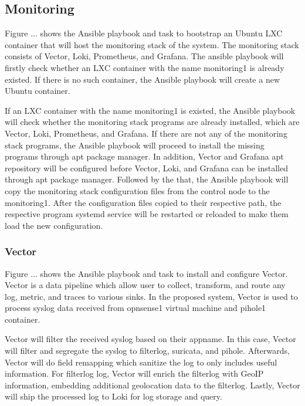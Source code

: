 \documentclass[../index.tex]{subfiles}
\begin{document}
\subsection{Monitoring}

Figure ... shows the Ansible playbook and task to bootstrap an Ubuntu LXC container that will host
the monitoring stack of the system. The monitoring stack consists of Vector, Loki, Prometheus, and
Grafana. The ansible playbook will firstly check whether an LXC container with the name monitoring1
is already existed. If there is no such container, the Ansible playbook will create a new Ubuntu
container.

If an LXC container with the name monitoring1 is existed, the Ansible playbook will check whether
the monitoring stack programs are already installed, which are Vector, Loki, Prometheus, and
Grafana. If there are not any of the monitoring stack programs, the Ansible playbook will proceed to
install the missing programs through apt package manager. In addition, Vector and Grafana apt
repository will be configured before Vector, Loki, and Grafana can be installed through apt package
manager. Followed by the that, the Ansible playbook will copy the monitoring stack configuration
files from the control node to the monitoring1. After the configuration files copied to their
respective path, the respective program systemd service will be restarted or reloaded to make them
load the new configuration.

\subsubsection{Vector}

Figure ... shows the Ansible playbook and task to install and configure Vector. Vector is a data
pipeline which allow user to collect, transform, and route any log, metric, and traces to various
sinks. In the proposed system, Vector is used to process syslog data received from opnsense1 virtual
machine and pihole1 container.

Vector will filter the received syslog based on their appname. In this case, Vector will filter and
segregate the syslog to filterlog, suricata, and pihole. Afterwards, Vector will do field remapping
which sanitize the log to only includes useful information. For filterlog log, Vector will enrich
the filterlog with GeoIP information, embedding additional geolocation data to the filterlog.
Lastly, Vector will ship the processed log to Loki for log storage
and query.
\end{document}
